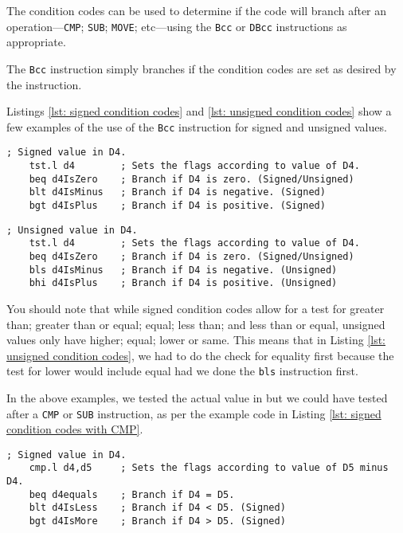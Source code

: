 The condition codes can be used to determine if the code will branch after an operation---\texttt{CMP}; \texttt{SUB}; \texttt{MOVE}; etc---using the \texttt{Bcc} or \texttt{DBcc} instructions as appropriate.

The \texttt{Bcc} instruction simply branches if the condition codes are set as desired by the instruction.

Listings \ref{lst: signed condition codes} and \ref{lst: unsigned condition codes} show a few examples of the use of the \texttt{Bcc} instruction for signed and unsigned values.

\begin{lstlisting}[caption={Signed condition codes},label={lst: signed condition codes}]
    ; Signed value in D4.
    tst.l d4        ; Sets the flags according to value of D4.
    beq d4IsZero    ; Branch if D4 is zero. (Signed/Unsigned)
    blt d4IsMinus   ; Branch if D4 is negative. (Signed)
    bgt d4IsPlus    ; Branch if D4 is positive. (Signed)
\end{lstlisting}    

\begin{lstlisting}[caption={Unsigned condition codes},label={lst: unsigned condition codes}]
    ; Unsigned value in D4.
    tst.l d4        ; Sets the flags according to value of D4.
    beq d4IsZero    ; Branch if D4 is zero. (Signed/Unsigned)
    bls d4IsMinus   ; Branch if D4 is negative. (Unsigned)
    bhi d4IsPlus    ; Branch if D4 is positive. (Unsigned)
\end{lstlisting}

You should note that while signed condition codes allow for a test for greater than; greater than or equal; equal; less than; and less than or equal, unsigned values only have higher; equal; lower or same. This means that in Listing \ref{lst: unsigned condition codes}, we had to do the check for equality first because the test for lower would include equal had we done the \texttt{bls} instruction first.

In the above examples, we tested the actual value in  but we could have tested after a \texttt{CMP} or \texttt{SUB} instruction, as per the example code in Listing \ref{lst: signed condition codes with CMP}.

\begin{lstlisting}[caption={Signed condition codes with CMP},label={lst: signed condition codes with CMP}]
    ; Signed value in D4.
    cmp.l d4,d5     ; Sets the flags according to value of D5 minus D4.
    beq d4equals    ; Branch if D4 = D5.
    blt d4IsLess    ; Branch if D4 < D5. (Signed)
    bgt d4IsMore    ; Branch if D4 > D5. (Signed)
\end{lstlisting}  

